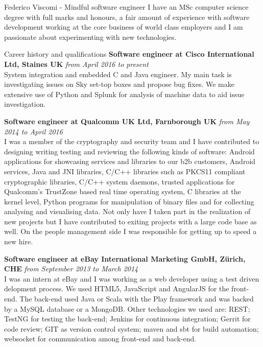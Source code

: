 \documentclass{resume}
\begin{document}
	\begin{rSection}{Federico Viscomi - Mindful software engineer}
		I have an MSc computer science degree with full marks and honours, 
		a fair amount of experience with software development working at the core business of world class employers 
		and I am passionate about experimenting with new technologies.
	\end{rSection}
	\begin{rSection}{Career history and qualifications}
		{\bf Software engineer at Cisco International Ltd, Staines UK} \hfill {\em from April 2016 to present}\\
			System integration and embedded C and Java engineer. 
			My main task is investigating issues on Sky set-top boxes and propose bug fixes. 
			We make extensive use of Python and Splunk for analysis of machine data to aid issue investigation.

		{\bf Software engineer at Qualcomm UK Ltd, Farnborough UK} \hfill {\em from May 2014 to April 2016}\\
			I was a member of the cryptography and security team and I have contributed to designing writing testing and reviewing the following kinds of software:
			Android applications for showcasing services and libraries to our b2b customers,
			Android services, 
			Java and JNI libraries, 
			C/C++ libraries such as PKCS11 compliant cryptographic libraries,
			C/C++ system daemons,
			trusted applications for Qualcomm's TrustZone based real time operating system,
			C libraries at the kernel level,
			Python programs for manipulation of binary files and for collecting analysing and visualising data.	
			Not only have I taken part in the realization of new projects but I have contributed to exiting projects with a large code base as well.
			On the people management side I was responsible for getting up to speed a new hire.

		{\bf Software engineer at eBay International Marketing GmbH, Z\"urich, CHE} \hfill {\em from September 2013 to March 2014}\\
			I was an intern at eBay and I was working as a web developer using a test driven delopment process. 
			We used HTML5, JavaScript and AngularJS for the front-end. 
			The back-end used Java or Scala with the Play framework and was backed by a MySQL database or a MongoDB. 
			Other technologies we used are: 
			REST; TestNG for testing the back-end; 
			Jenkins for continuous integration; 
			Gerrit for code review; 
			GIT as version control system; 
			maven and sbt for build automation;
			websocket for communication among front-end and back-end.	  
	    

\end{rSection}
\end{document}
